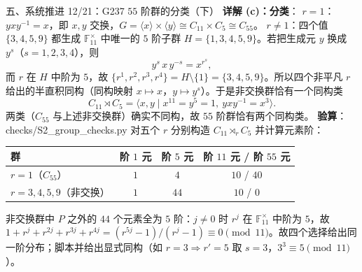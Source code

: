 \documentclass[aspectratio=169,10pt,fontset=none]{ctexbeamer}
\newcommand{\key}[1]{\textcolor{ink}{\bfseries #1}}
\begin{document}
\begin{frame}[t]{五、系统推进 12/21：G237 $55$ 阶群的分类（下）}
\scriptsize
\key{详解 (c)：分类}：
\textbf{$r=1$}：$yxy^{-1}=x$，即 $x,y$ 交换，$G=\langle x\rangle\times\langle y\rangle\cong C_{11}\times C_5\cong C_{55}$。
\textbf{$r\ne1$}：四个值 $\{3,4,5,9\}$ 都生成 $\mathbb F_{11}^\times$ 中唯一的 $5$ 阶子群 $H=\{1,3,4,5,9\}$。若把生成元 $y$ 换成 $y^s$（$s=1,2,3,4$），则
\[ y^s\,x\,y^{-s}=x^{r^s}, \]
而 $r$ 在 $H$ 中阶为 $5$，故 $\{r^1,r^2,r^3,r^4\}=H\setminus\{1\}=\{3,4,5,9\}$。所以四个非平凡 $r$ 给出的半直积同构（同构映射 $x\mapsto x$，$y\mapsto y^s$）。于是非交换群恰有一个同构类
\[ C_{11}\rtimes C_5=\langle x,y\mid x^{11}=y^5=1,\ yxy^{-1}=x^3\rangle . \]
两类（$C_{55}$ 与上述非交换群）确实不同构，故 $55$ 阶群恰有两个同构类。
\key{验算}：\textsf{checks/S2\_group\_checks.py} 对五个 $r$ 分别构造 $C_{11}\rtimes_r C_5$ 并计算元素阶：
\begin{center}
\begin{tabular}{@{}lccc@{}}
\toprule
群 & 阶 $1$ 元 & 阶 $5$ 元 & 阶 $11$ 元 / 阶 $55$ 元\\
\midrule
$r=1$（$C_{55}$） & $1$ & $4$ & $10$ / $40$\\
$r=3,4,5,9$（非交换） & $1$ & $44$ & $10$ / $0$\\
\bottomrule
\end{tabular}
\end{center}
非交换群中 $P$ 之外的 $44$ 个元素全为 $5$ 阶：$j\ne0$ 时 $r^j$ 在 $\mathbb F_{11}^\times$ 中阶为 $5$，故 $1+r^j+r^{2j}+r^{3j}+r^{4j}=(r^{5j}-1)/(r^j-1)\equiv0\pmod{11}$。故四个选择给出同一阶分布；脚本并给出显式同构（如 $r=3\Rightarrow r'=5$ 取 $s=3$，$3^3\equiv5\pmod{11}$）。
\end{frame}
\end{document}
